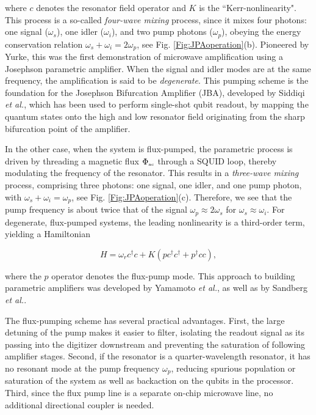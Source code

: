 \documentclass[aip,apr,twocolumn,showpacs,superscriptaddress,groupedaddress,nofootinbib,reprint]{revtex4-1}  %
\begin{document}
\noindent where $c$ denotes the resonator field operator and $K$ is the ``Kerr-nonlinearity". This process is a so-called \textit{four-wave mixing} process, since it mixes four photons: one signal ($\omega_s$), one idler ($\omega_i$), and two pump photons ($\omega_p$), obeying the energy conservation relation $\omega_s + \omega_i = 2\omega_p$, see Fig. \ref{Fig:JPAoperation}(b). Pioneered by Yurke\cite{Yurke1989}, this was the first demonstration of microwave amplification using a Josephson parametric amplifier. When the signal and idler modes are at the same frequency, the amplification is said to be \textit{degenerate}. This pumping scheme is the foundation for the Josephson Bifurcation Amplifier (JBA), developed by Siddiqi \textit{et al.}\cite{Siddiqi2004,Vijay2009,Lee2007}, which has been used to perform single-shot qubit readout, by mapping the quantum states onto the high and low resonator field originating from the sharp bifurcation point of the amplifier\cite{Mallet2009}.

In the other case, when the system is flux-pumped, the parametric process is driven by threading a magnetic flux $\Phi_{\mbox{\tiny{ac}}}$ through a SQUID loop, thereby modulating the frequency of the resonator. This results in a \textit{three-wave mixing} process, comprising three photons: one signal, one idler, and one pump photon, with $\omega_s + \omega_i = \omega_p$, see Fig. \ref{Fig:JPAoperation}(c). Therefore, we see that the pump frequency is about twice that of the signal $\omega_p \approx 2\omega_s$ for $\omega_s \approx \omega_i$. For degenerate, flux-pumped systems, the leading nonlinearity is a third-order term, yielding a Hamiltonian

\begin{equation}
H = \omega_{r}c^{\dagger}c + K \left( pc^{\dagger}c^{\dagger} + p^{\dagger}cc\right),
\label{Eq:Hthreewave}
\end{equation}

\noindent where the $p$ operator denotes the flux-pump mode. This approach to building parametric amplifiers was developed by Yamamoto \textit{et al.}\cite{Yamamoto2008}, as well as by Sandberg \textit{et al.}\cite{Sandberg2008}.

The flux-pumping scheme has several practical advantages. First, the large detuning of the pump makes it easier to filter, isolating the readout signal as its passing into the digitizer downstream and preventing the saturation of following amplifier stages. Second, if the resonator is a quarter-wavelength resonator, it has no resonant mode at the pump frequency $\omega_p$, reducing spurious population or saturation of the system as well as backaction on the qubits in the processor. Third, since the flux pump line is a separate on-chip microwave line, no additional directional coupler is needed.
\end{document}
